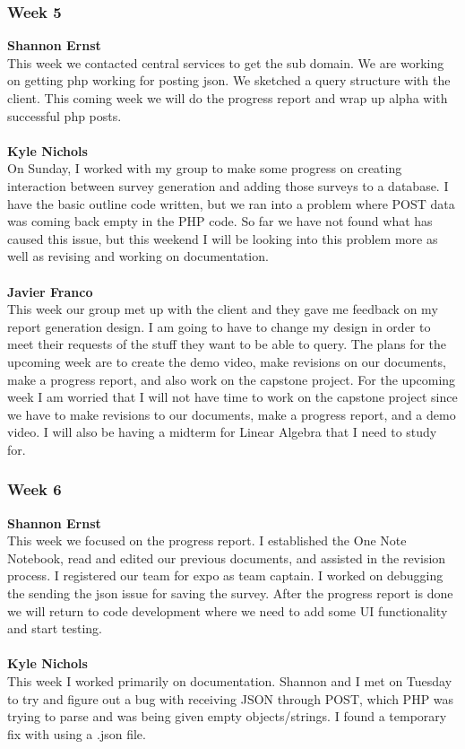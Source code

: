 \documentclass[../final.tex]{subfiles}
\begin{document}
\subsubsection{Week 5}
\textbf{Shannon Ernst}\\
This week we contacted central services to get the sub domain. We are working on getting php working for posting json. We sketched a query structure with the client. This coming week we will do the progress report and wrap up alpha with successful php posts. \\ \\
\textbf{Kyle Nichols}\\
On Sunday, I worked with my group to make some progress on creating interaction between survey generation and adding those surveys to a database. I have the basic outline code written, but we ran into a problem where POST data was coming back empty in the PHP code. So far we have not found what has caused this issue, but this weekend I will be looking into this problem more as well as revising and working on documentation. \\ \\
\textbf{Javier Franco}\\
This week our group met up with the client and they gave me feedback on my report generation design. I am going to have to change my design in order to meet their requests of the stuff they want to be able to query. The plans for the upcoming week are to create the demo video, make revisions on our documents, make a progress report, and also work on the capstone project. For the upcoming week I am worried that I will not have time to work on the capstone project since we have to make revisions to our documents, make a progress report, and a demo video. I will also be having a midterm for Linear Algebra that I need to study for. \\
\subsubsection{Week 6}
\textbf{Shannon Ernst}\\ 
This week we focused on the progress report. I established the One Note Notebook, read and edited our previous documents, and assisted in the revision process. I registered our team for expo as team captain. I worked on debugging the sending the json issue for saving the survey. After the progress report is done we will return to code development where we need to add some UI functionality and start testing.\\ \\
\textbf{Kyle Nichols}\\
This week I worked primarily on documentation. Shannon and I met on Tuesday to try and figure out a bug with receiving JSON through POST, which PHP was trying to parse and was being given empty objects/strings. I found a temporary fix with using a .json file.
\end{document}
